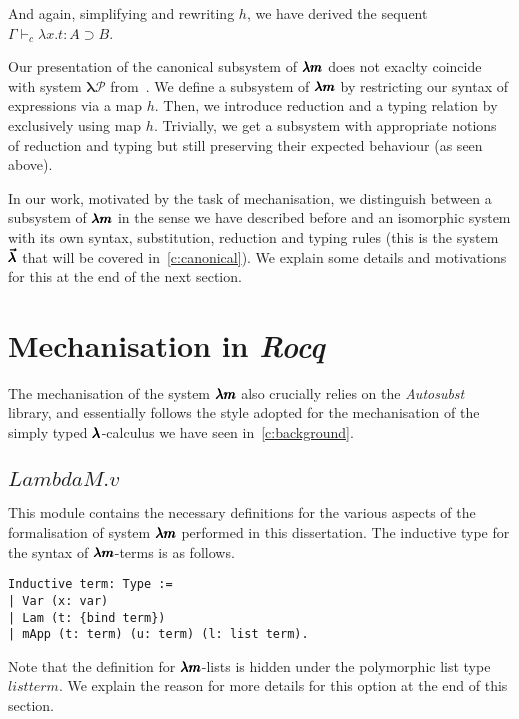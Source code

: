 And again, simplifying and rewriting $h$, we have derived the sequent $\Gamma \vdash_c \lambda x.t : A \supset B$.

Our presentation of the canonical subsystem of $\pmb{\lambda m}$ does not exaclty coincide with system $\pmb{\lambda \mathcal{P}}$ from~\cite[Chapter~3.1]{JCES2002}.
We define a subsystem of $\pmb{\lambda m}$ by restricting our syntax of expressions via a map $h$.
Then, we introduce reduction and a typing relation by exclusively using map $h$.
Trivially, we get a subsystem with appropriate notions of reduction and typing but still preserving their expected behaviour (as seen above).

In our work, motivated by the task of mechanisation, we distinguish between a subsystem of $\pmb{\lambda m}$ in the sense we have described before and an isomorphic system with its own syntax, substitution, reduction and typing rules (this is the system~$\pmb{\vec \lambda}$ that will be covered in~\cref{c:canonical}).
We explain some details and motivations for this at the end of the next section.


\section{Mechanisation in \textit{Rocq}}

The mechanisation of the system $\pmb{\lambda m}$ also crucially relies on the \textit{Autosubst} library, and essentially follows the style adopted for the mechanisation of the simply typed $\pmb{\lambda}$-calculus we have seen in~\cref{c:background}.

\subsection{\lst$LambdaM.v$}

This module contains the necessary definitions for the various aspects of the formalisation of system $\pmb{\lambda m}$ performed in this dissertation.
The inductive type for the syntax of $\pmb{\lambda m}$-terms is as follows.
\begin{lstlisting}[language=Coq]
Inductive term: Type :=
| Var (x: var)
| Lam (t: {bind term})
| mApp (t: term) (u: term) (l: list term).
\end{lstlisting}
Note that the definition for $\pmb{\lambda m}$-lists is hidden under the polymorphic list type \lst$list term$.
We explain the reason for more details for this option at the end of this section.

